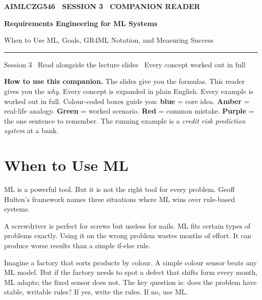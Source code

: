 \documentclass[a4paper,11pt]{article}
\newcommand{\titlebanner}[4]{%
  \begin{tcolorbox}[
    enhanced, breakable=false,
    colback=navy, colframe=navy,
    boxrule=0pt, arc=3pt, outer arc=3pt,
    left=16pt, right=16pt, top=16pt, bottom=16pt,
    before skip=2pt, after skip=14pt,
    width=\linewidth ]
    {\sffamily\footnotesize\bfseries\color{white!85}\MakeUppercase{#1}}\par
    \vspace{6pt}
    {\sffamily\bfseries\fontsize{30}{34}\selectfont\color{white} #2\par}
    \vspace{5pt}
    {\sffamily\large\color{white!88} #3\par}
    \vspace{9pt}
    {\color{white!55}\rule{\linewidth}{0.4pt}}\par
    \vspace{6pt}
    {\sffamily\footnotesize\color{white!82} #4\par}
  \end{tcolorbox}%
}
\begin{document}
\thispagestyle{fancy}

\titlebanner
  {AIMLCZG546 \textperiodcentered\ Session 3 \textperiodcentered\ Companion Reader}
  {Requirements Engineering for ML Systems}
  {When to Use ML, Goals, GR4ML Notation, and Measuring Success}
  {Session 3 \textperiodcentered\ Read alongside the lecture slides \textperiodcentered\ Every concept worked out in full}

\noindent\textbf{How to use this companion.}
The slides give you the formulas. This reader gives you the \emph{why}.
Every concept is expanded in plain English. Every example is worked out in full.
Colour-coded boxes guide you: \textcolor{intuFrame}{\textbf{blue}} = core idea.
\textcolor{everyFrame}{\textbf{Amber}} = real-life analogy.
\textcolor{workFrame}{\textbf{Green}} = worked scenario.
\textcolor{watchFrame}{\textbf{Red}} = common mistake.
\textcolor{keyFrame}{\textbf{Purple}} = the one sentence to remember.
The running example is a \emph{credit risk prediction system} at a bank.

\medskip

\section{When to Use ML}

ML is a powerful tool. But it is not the right tool for every problem.
Geoff Hulten's framework names three situations where ML wins over rule-based systems.

\begin{intuition}
A screwdriver is perfect for screws but useless for nails.
ML fits certain types of problems exactly.
Using it on the wrong problem wastes months of effort.
It can produce worse results than a simple if-else rule.
\end{intuition}

\begin{everyday}
Imagine a factory that sorts products by colour.
A simple colour sensor beats any ML model.
But if the factory needs to spot a defect that shifts form every month,
ML adapts; the fixed sensor does not.
The key question is: does the problem have stable, writable rules?
If yes, write the rules.
If no, use ML.
\end{everyday}
\end{document}
